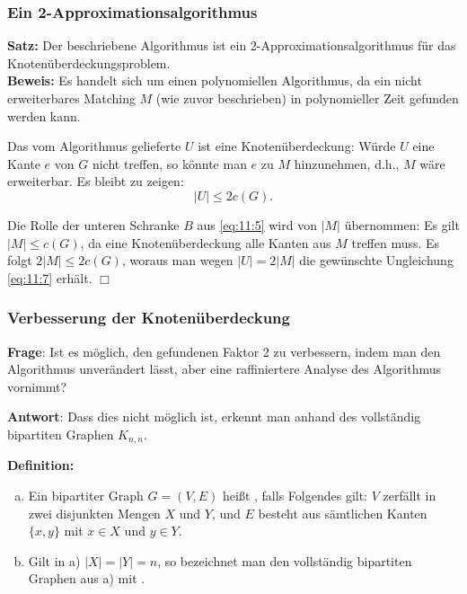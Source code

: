 \documentclass[smaller]{beamer}
\begin{document}
\begin{frame}
\frametitle{Ein 2-Approximationsalgorithmus}
\textbf{Satz:} Der beschriebene Algorithmus ist ein 2-Approximationsalgorithmus für das Knotenüberdeckungsproblem. \\ \vspace*{0.2cm}
\textbf{Beweis:} Es handelt sich um einen \alert{polynomiellen Algorithmus}, da ein nicht erweiterbares Matching $M$ (wie zuvor beschrieben) in polynomieller Zeit gefunden werden kann. \\ \vspace*{0.2cm}

\alert{Das vom Algorithmus gelieferte $U$ ist eine Knotenüberdeckung:} Würde $U$ eine Kante $e$ von $G$ nicht treffen, so könnte man $e$ zu $M$ hinzunehmen, d.h., $M$ wäre erweiterbar. Es bleibt zu zeigen:
\begin{equation}
\label{eq:11:7}
|U| \leq 2c(G).
\end{equation}

Die Rolle der unteren Schranke $B$ aus \eqref{eq:11:5} wird von $|M|$ übernommen: Es gilt $|M| \leq c(G)$, da eine Knotenüberdeckung alle Kanten aus $M$ treffen muss. Es folgt $2|M| \leq 2c(G)$, woraus man wegen $|U|=2|M|$ die gewünschte Ungleichung \eqref{eq:11:7} erhält. \qquad $\Box$
\end{frame}

\begin{frame}
\frametitle{Verbesserung der Knotenüberdeckung}
\textbf{Frage}: Ist es möglich, den gefundenen Faktor 2 zu verbessern, indem man den Algorithmus unverändert lässt, aber eine raffiniertere Analyse des Algorithmus vornimmt? \\ \vspace*{0.2cm}

\textbf{Antwort}: Dass dies nicht möglich ist, erkennt man anhand des vollständig bipartiten Graphen $K_{n,n}$. \\ \vspace*{0.2cm}

\textbf{Definition:} 
\begin{enumerate}[a)]
\item Ein bipartiter Graph $G = (V,E)$ heißt , falls Folgendes gilt: $V$ zerfällt in zwei disjunkten Mengen $X$ und $Y$, und $E$ besteht aus sämtlichen Kanten $\{x, y\}$ mit $x \in X$ und $y \in Y$. 
\item Gilt in a) $|X| = |Y| = n$, so bezeichnet man den vollständig bipartiten Graphen aus a) mit .
\end{enumerate}
\end{frame}
\end{document}
